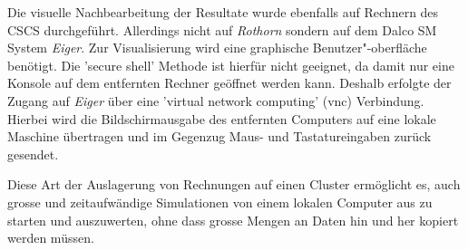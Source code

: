 Die visuelle Nachbearbeitung der Resultate wurde ebenfalls auf Rech\-nern des CSCS durchgeführt. Allerdings nicht auf \emph{Rothorn} sondern auf dem \linebreak Dalco SM System \emph{Eiger}.
Zur Visualisierung wird eine graphische Benutzer"-oberfläche benötigt. Die 'secure shell' Methode ist hierfür nicht geeignet, da damit nur eine Konsole auf dem entfernten Rechner geöffnet werden kann. Deshalb erfolgte der Zugang auf \emph{Eiger} über eine 'virtual network compu\-ting' (vnc) Verbindung. Hierbei wird die Bildschirmausgabe des entfernten Computers auf eine lokale Maschine übertragen und im Gegenzug Maus- und Tastatureingaben zurück gesendet.

Diese Art der Auslagerung von Rechnungen auf einen Cluster ermöglicht es, auch grosse und zeitaufwändige Simulationen von einem lokalen Computer aus zu starten und auszuwerten, ohne dass grosse Mengen an Daten hin und her kopiert werden müssen.
